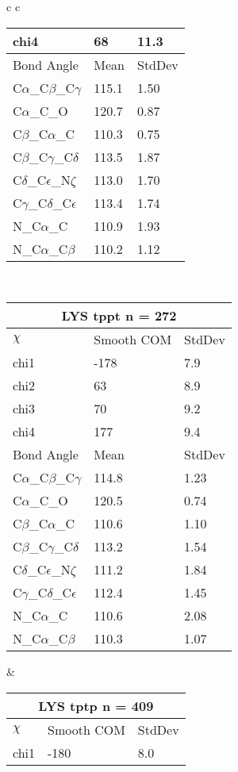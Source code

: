 \begin{longtable}{ c c }
\begin{tabular}{ l l l }
  chi4 & 68 & 11.3 \\ \midrule
  Bond Angle   & Mean     & StdDev \\ \midrule
  C$\alpha$\_C$\beta$\_C$\gamma$ & 115.1 & 1.50\\
  C$\alpha$\_C\_O & 120.7 & 0.87\\
  C$\beta$\_C$\alpha$\_C & 110.3 & 0.75\\
  C$\beta$\_C$\gamma$\_C$\delta$ & 113.5 & 1.87\\
  C$\delta$\_C$\epsilon$\_N$\zeta$ & 113.0 & 1.70\\
  C$\gamma$\_C$\delta$\_C$\epsilon$ & 113.4 & 1.74\\
  N\_C$\alpha$\_C & 110.9 & 1.93\\
  N\_C$\alpha$\_C$\beta$ & 110.2 & 1.12\\
  \bottomrule
  \end{tabular}
  \\
  \begin{tabular}{ l l l }
  \toprule
  \multicolumn{3}{c}{LYS \textbf{tppt} n = 272} \\ \toprule
  $\chi$       & Smooth COM & StdDev \\ \midrule
  chi1 & -178 & 7.9 \\ 
  chi2 & 63 & 8.9 \\ 
  chi3 & 70 & 9.2 \\ 
  chi4 & 177 & 9.4 \\ \midrule
  Bond Angle   & Mean     & StdDev \\ \midrule
  C$\alpha$\_C$\beta$\_C$\gamma$ & 114.8 & 1.23\\
  C$\alpha$\_C\_O & 120.5 & 0.74\\
  C$\beta$\_C$\alpha$\_C & 110.6 & 1.10\\
  C$\beta$\_C$\gamma$\_C$\delta$ & 113.2 & 1.54\\
  C$\delta$\_C$\epsilon$\_N$\zeta$ & 111.2 & 1.84\\
  C$\gamma$\_C$\delta$\_C$\epsilon$ & 112.4 & 1.45\\
  N\_C$\alpha$\_C & 110.6 & 2.08\\
  N\_C$\alpha$\_C$\beta$ & 110.3 & 1.07\\
  \bottomrule
  \end{tabular}
  &
  \begin{tabular}{ l l l }
  \toprule
  \multicolumn{3}{c}{LYS \textbf{tptp} n = 409} \\ \toprule
  $\chi$       & Smooth COM & StdDev \\ \midrule
  chi1 & -180 & 8.0 \\ 

\end{tabular}
\end{longtable}
